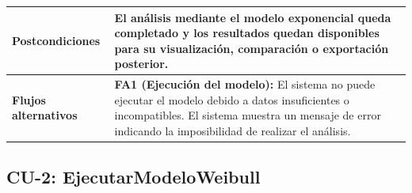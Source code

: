 \begin{longtable}{|p{4cm}|p{10cm}|}
\textbf{Postcondiciones} & 
El análisis mediante el modelo exponencial queda completado y los resultados quedan disponibles para su visualización, comparación o exportación posterior. \\ \hline

\textbf{Flujos alternativos} & 
\textbf{FA1 (Ejecución del modelo):} El sistema no puede ejecutar el modelo debido a datos insuficientes o incompatibles. El sistema muestra un mensaje de error indicando la imposibilidad de realizar el análisis. \\ \hline

\end{longtable}

\newpage
    \small
    \subsection{CU-2: EjecutarModeloWeibull}
